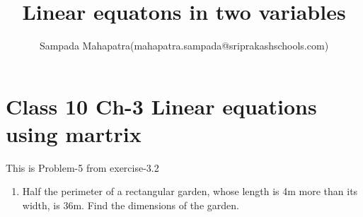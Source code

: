 \documentclass[12pt]{article}
\title{Linear equatons in two variables}
\author{Sampada Mahapatra(mahapatra.sampada@sriprakashschools.com)}
\begin{document}
\maketitle
\section*{Class 10 Ch-3 Linear equations using martrix}
This is Problem-5 from exercise-3.2
\begin{enumerate}
\item {Half the perimeter of a rectangular garden, whose length is 4m more than its width, is 36m. Find the dimensions of the garden.}

\end{enumerate}
\end{document}

